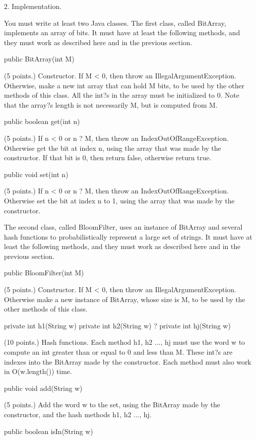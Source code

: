 2. Implementation.

You must write at least two Java classes. The first class, called BitArray, implements an array of bits. It must have at least the following methods, and they must work as described here and in the previous section.

public BitArray(int M)

(5 points.) Constructor. If M < 0, then throw an IllegalArgumentException. Otherwise, make a new int array that can hold M bits, to be used by the other methods of this class. All the int?s in the array must be initialized to 0. Note that the array?s length is not necessarily M, but is computed from M.

public boolean get(int n)

(5 points.) If n < 0 or n ? M, then throw an IndexOutOfRangeException. Otherwise get the bit at index n, using the array that was made by the constructor. If that bit is 0, then return false, otherwise return true.

public void set(int n)

(5 points.) If n < 0 or n ? M, then throw an IndexOutOfRangeException. Otherwise set the bit at index n to 1, using the array that was made by the constructor.

The second class, called BloomFilter, uses an instance of BitArray and several hash functions to probabilistically represent a large set of strings. It must have at least the following methods, and they must work as described here and in the previous section.

public BloomFilter(int M)

(5 points.) Constructor. If M < 0, then throw an IllegalArgumentException. Otherwise make a new instance of BitArray, whose size is M, to be used by the other methods of this class.

private int h1(String w)  
private int h2(String w)  
           ?  
private int hj(String w)

(10 points.) Hash functions. Each method h1, h2 ..., hj must use the word w to compute an int greater than or equal to 0 and less than M. These int?s are indexes into the BitArray made by the constructor. Each method must also work in O(w.length()) time.

public void add(String w)

(5 points.) Add the word w to the set, using the BitArray made by the constructor, and the hash methods h1, h2 ..., hj.

public boolean isIn(String w)

